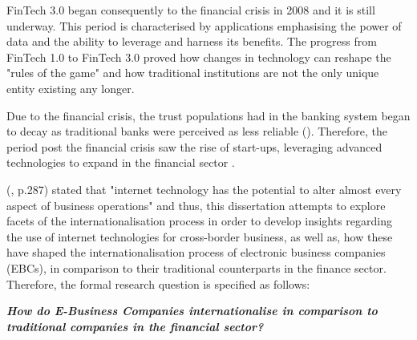\documentclass[11pt,a4paper]{article}
\begin{document}
FinTech 3.0 began consequently to the financial crisis in 2008 and it is still underway. This period is characterised by applications emphasising the power of data and the ability to leverage and harness its benefits. The progress from FinTech 1.0 to FinTech 3.0 proved how changes in technology can reshape the "rules of the game" and how traditional institutions are not the only unique entity existing any longer. \par
Due to the financial crisis, the trust populations had in the banking system began to decay as traditional banks were perceived as less reliable (\cite{andrewConfidenceBanksLow2015}). Therefore, the period post the financial crisis saw the rise of start-ups, leveraging advanced technologies to expand in the financial sector \parencite{arner150YearsFintech2016}.  \par
\citeauthor{parasuramanMarketingServingCustomers2002} (\citeyear{parasuramanMarketingServingCustomers2002}, p.287) stated that "internet technology has the potential to alter almost every aspect of business operations"  and thus, this dissertation attempts to explore facets of the internationalisation process in order to  develop insights regarding the use of internet technologies for cross-border business, as well as, how these have shaped the internationalisation process of electronic business companies (EBCs), in comparison to their traditional counterparts in the finance sector.  Therefore, the formal research question is specified as follows:

\begin{center}
\textbf{\textit{How do E-Business Companies internationalise in comparison to traditional companies in the financial sector?}}
\end{center}
 


\newpage





\end{document}
